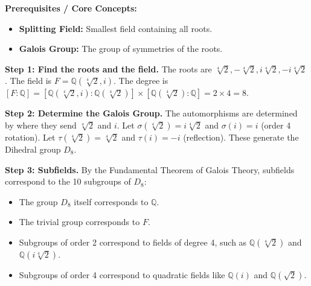 \begin{solution}
\textbf{Prerequisites / Core Concepts:}
\begin{itemize}
    \item \textbf{Splitting Field:} Smallest field containing all roots.
    \item \textbf{Galois Group:} The group of symmetries of the roots.
\end{itemize}

\textbf{Step 1: Find the roots and the field.}
The roots are $\sqrt[4]{2}, -\sqrt[4]{2}, i\sqrt[4]{2}, -i\sqrt[4]{2}$.
The field is $F = \mathbb{Q}(\sqrt[4]{2}, i)$.
The degree is $[F:\mathbb{Q}] = [\mathbb{Q}(\sqrt[4]{2}, i) : \mathbb{Q}(\sqrt[4]{2})] \times [\mathbb{Q}(\sqrt[4]{2}) : \mathbb{Q}] = 2 \times 4 = 8$.

\textbf{Step 2: Determine the Galois Group.}
The automorphisms are determined by where they send $\sqrt[4]{2}$ and $i$.
Let $\sigma(\sqrt[4]{2}) = i\sqrt[4]{2}$ and $\sigma(i) = i$ (order 4 rotation).
Let $\tau(\sqrt[4]{2}) = \sqrt[4]{2}$ and $\tau(i) = -i$ (reflection).
These generate the Dihedral group $D_8$.

\textbf{Step 3: Subfields.}
By the Fundamental Theorem of Galois Theory, subfields correspond to the 10 subgroups of $D_8$:
\begin{itemize}
    \item The group $D_8$ itself corresponds to $\mathbb{Q}$.
    \item The trivial group corresponds to $F$.
    \item Subgroups of order 2 correspond to fields of degree 4, such as $\mathbb{Q}(\sqrt[4]{2})$ and $\mathbb{Q}(i\sqrt[4]{2})$.
    \item Subgroups of order 4 correspond to quadratic fields like $\mathbb{Q}(i)$ and $\mathbb{Q}(\sqrt{2})$.
\end{itemize}
\end{solution}
